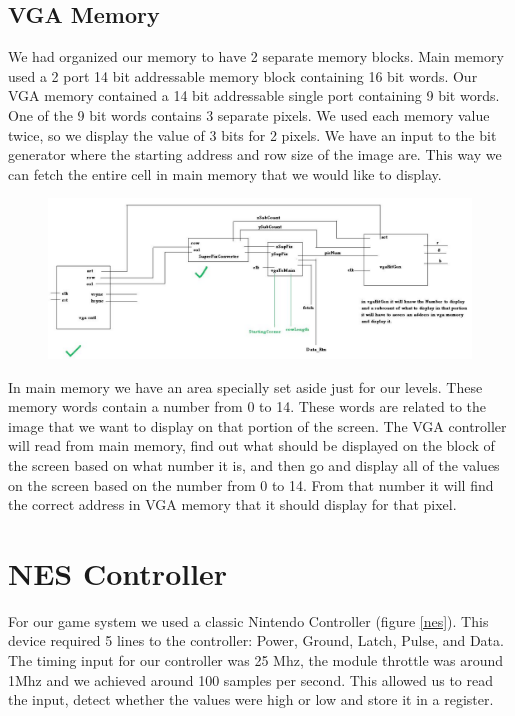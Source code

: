 \documentclass{article}
\begin{document}
\subsection{VGA Memory}
We had organized our memory to have 2 separate memory blocks.  Main memory used a 2 port 14 bit addressable memory block containing 16 bit words. Our VGA memory contained a 14 bit addressable single port containing 9 bit words.  One of the 9 bit words contains 3 separate pixels.   We used each memory value twice, so we display the value of 3 bits for 2 pixels. We have an input to the bit generator where the starting address and row size of the image are.  This way we can fetch the entire cell in main memory that we would like to display.

\begin{figure}[h!]
	\centering
	\includegraphics[width = 1\textwidth]{VGAdiagram.png}
	\label{vga}
\end{figure}

In main memory we have an area specially set aside just for our levels.  These memory words contain a number from 0 to 14.  These words are related to the image that we want to display on that portion of the screen.  The VGA controller will read from main memory, find out what should be displayed on the block of the screen based on what number it is, and then go and display all of the values on the screen based on the number from 0 to 14.  From that number it will find the correct address in VGA memory that it should display for that pixel. 
 

\section{NES Controller}
For our game system we used a classic Nintendo Controller (figure \ref{nes}). This device required 5 lines to the controller: Power, Ground, Latch, Pulse, and Data.  The timing input for our controller was 25 Mhz, the module throttle was around 1Mhz and we achieved around 100 samples per second. This allowed us to read the input, detect whether the values were high or low and store it in a register. 
\end{document}
